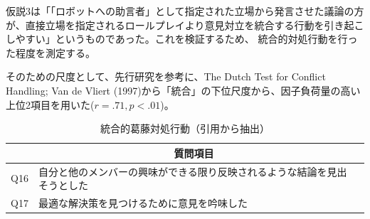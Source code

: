\documentclass[11pt, a4paper]{jreport} %
\begin{document}

仮説3は「「ロボットへの助言者」として指定された立場から発言させた議論の方が、直接立場を指定されるロールプレイより意見対立を統合する行動を引き起こしやすい」というものであった。これを検証するため、
統合的対処行動を行った程度を測定する。

そのための尺度として、先行研究\cite{村山綾20141203}を参考に、The Dutch Test for Conflict Handling; Van de Vliert (1997)から「統合」の下位尺度から、因子負荷量の高い上位2項目を用いた($r=.71, p<.01$)。

\begin{table}[H]
\caption{統合的葛藤対処行動（引用から抽出）}
\centering
\label{tab:conflict_deal}
\begin{tabular}{@{}lll@{}}
\toprule
\multicolumn{1}{c}{} & \multicolumn{1}{c}{質問項目}             \\ \midrule
             Q16      & 自分と他のメンバーの興味ができる限り反映されるような結論を見出そうとした \\
                 Q17    & 最適な解決策を見つけるために意見を吟味した                 \\ \bottomrule
\end{tabular}
\end{table}
\end{document}
